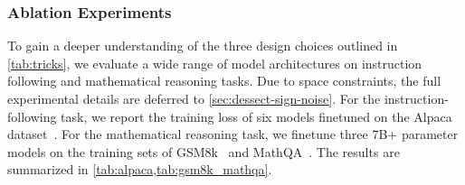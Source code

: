 \documentclass{article}
\begin{document}
\subsubsection{Ablation Experiments\label{sec:ablation}}

To gain a deeper understanding of the three design choices outlined in \cref{tab:tricks}, we evaluate a wide range of model architectures on instruction following and mathematical reasoning tasks. Due to space constraints, the full experimental details are deferred to \cref{sec:dessect-sign-noise}. For the instruction-following task, we report the training loss of six models finetuned on the Alpaca dataset~\citep{taori2023alpaca}. For the mathematical reasoning task, we finetune three 7B+ parameter models on the training sets of GSM8k~\citep{cobbe2021gsm8k} and MathQA~\citep{amini-etal-2019-mathqa}. The results are summarized in \cref{tab:alpaca,tab:gsm8k_mathqa}.

\begin{table}[htbp]
\centering

\caption{Training loss on the Alpaca dataset. Results are reported as mean $\pm$ error.\label{tab:alpaca}}
\vspace{-5pt}
\vspace{-10pt}
\end{table}
\end{document}

